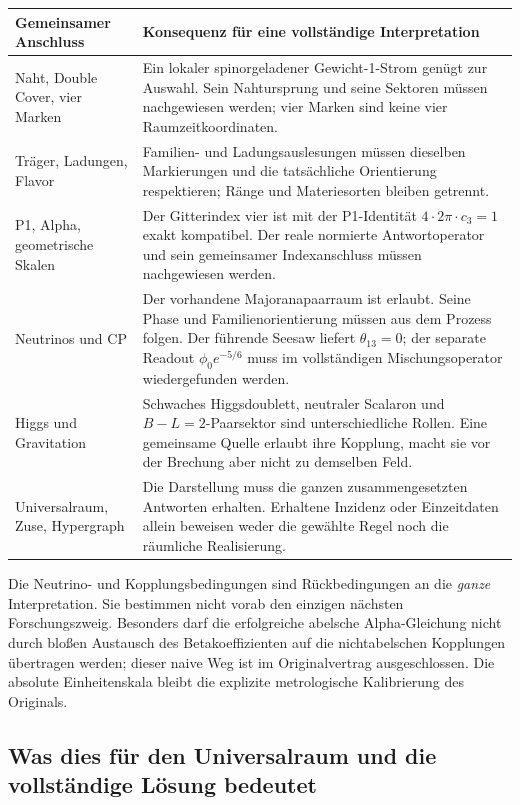 \begin{tabularx}{\linewidth}{lY}
\toprule
Gemeinsamer Anschluss & Konsequenz für eine vollständige Interpretation\\\midrule
Naht, Double Cover, vier Marken & Ein lokaler spinorgeladener Gewicht-1-Strom genügt zur Auswahl. Sein Nahtursprung und seine Sektoren müssen nachgewiesen werden; vier Marken sind keine vier Raumzeitkoordinaten.\\
Träger, Ladungen, Flavor & Familien- und Ladungsauslesungen müssen dieselben Markierungen und die tatsächliche Orientierung respektieren; Ränge und Materiesorten bleiben getrennt.\\
P1, Alpha, geometrische Skalen & Der Gitterindex vier ist mit der P1-Identität $4\cdot2\pi\cdot c_3=1$ exakt kompatibel. Der reale normierte Antwortoperator und sein gemeinsamer Indexanschluss müssen nachgewiesen werden.\\
Neutrinos und CP & Der vorhandene Majoranapaarraum ist erlaubt. Seine Phase und Familienorientierung müssen aus dem Prozess folgen. Der führende Seesaw liefert $\theta_{13}=0$; der separate Readout $\phi_0e^{-5/6}$ muss im vollständigen Mischungsoperator wiedergefunden werden.\\
Higgs und Gravitation & Schwaches Higgsdoublett, neutraler Scalaron und $B-L=2$-Paarsektor sind unterschiedliche Rollen. Eine gemeinsame Quelle erlaubt ihre Kopplung, macht sie vor der Brechung aber nicht zu demselben Feld.\\
Universalraum, Zuse, Hypergraph & Die Darstellung muss die ganzen zusammengesetzten Antworten erhalten. Erhaltene Inzidenz oder Einzeitdaten allein beweisen weder die gewählte Regel noch die räumliche Realisierung.\\\bottomrule
\end{tabularx}

Die Neutrino- und Kopplungsbedingungen sind Rückbedingungen an die \emph{ganze} Interpretation. Sie bestimmen nicht vorab den einzigen nächsten Forschungszweig. Besonders darf die erfolgreiche abelsche Alpha-Gleichung nicht durch bloßen Austausch des Betakoeffizienten auf die nichtabelschen Kopplungen übertragen werden; dieser naive Weg ist im Originalvertrag  ausgeschlossen. Die absolute Einheitenskala bleibt die explizite metrologische Kalibrierung des Originals.

\subsection{Was dies für den Universalraum und die vollständige Lösung bedeutet}

